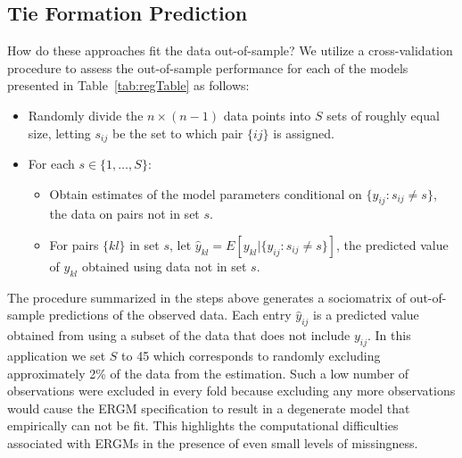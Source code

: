 \documentclass[9pt,twocolumn,twoside,lineno]{pnas-new}
\begin{document}
\subsection*{Tie Formation Prediction}

How do these approaches fit the data out-of-sample? We utilize a cross-validation procedure to assess the out-of-sample performance for each of the models presented in Table~\ref{tab:regTable} as follows:

\begin{itemize}
	\item Randomly divide the $n \times (n-1)$ data points into $S$ sets of roughly equal size, letting $s_{ij}$ be the set to which pair $\{ij\}$ is assigned.
	\item For each $s \in \{1, \ldots, S\}$:
	\begin{itemize}
		\item Obtain estimates of the model parameters conditional on $\{y_{ij} : s_{ij} \neq s\}$, the data on pairs not in set $s$.
		\item For pairs $\{kl\}$ in set $s$, let $\hat y_{kl} = E[y_{kl} | \{y_{ij} : s_{ij} \neq s\}]$, the predicted value of $y_{kl}$ obtained using data not in set $s$.
	\end{itemize}
\end{itemize}

The procedure summarized in the steps above generates a sociomatrix of out-of-sample predictions of the observed data. Each entry $\hat y_{ij}$ is a predicted value obtained from using a subset of the data that does not include $y_{ij}$. In this application we set $S$ to 45 which corresponds to randomly excluding approximately 2\% of the data from the estimation. Such a low number of observations were excluded in every fold because excluding any more observations would cause the ERGM specification to result in a degenerate model that empirically can not be fit. This highlights the computational difficulties associated with ERGMs in the presence of even small levels of missingness.
\end{document}
